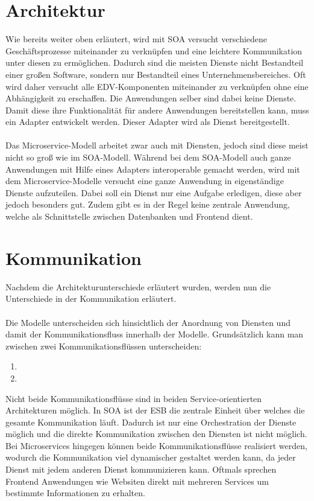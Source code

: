 \section{Architektur}
\label{sec:FazitArchitektur}
Wie bereits weiter oben erläutert, wird mit SOA versucht verschiedene Geschäftsprozesse miteinander zu verknüpfen und eine leichtere Kommunikation unter diesen zu ermöglichen. Dadurch sind die meisten Dienste nicht  Bestandteil einer großen Software, sondern nur Bestandteil eines Unternehmensbereiches. Oft wird daher versucht alle EDV-Komponenten miteinander zu verknüpfen ohne eine Abhängigkeit zu erschaffen. Die Anwendungen selber sind dabei keine Dienste. Damit diese ihre Funktionalität für andere Anwendungen bereitstellen kann, muss ein Adapter entwickelt werden. Dieser Adapter wird als Dienst bereitgestellt.
\\\\
Das Microservice-Modell arbeitet zwar auch mit Diensten, jedoch sind diese meist nicht so groß wie im SOA-Modell. Während bei dem SOA-Modell auch ganze Anwendungen mit Hilfe eines Adapters interoperable gemacht werden, wird mit dem Microservice-Modelle versucht eine ganze Anwendung in eigenständige  Dienste aufzuteilen. Dabei soll ein Dienst nur eine Aufgabe erledigen, diese aber jedoch besonders gut. Zudem gibt es in der Regel keine zentrale Anwendung, welche als Schnittstelle zwischen Datenbanken und Frontend dient.

\section{Kommunikation}
\label{sec:FazitKommunikation}
Nachdem die Architekturunterschiede erläutert wurden, werden nun die Unterschiede in der Kommunikation erläutert.
\\\\
Die Modelle unterscheiden sich hinsichtlich der Anordnung von Diensten und damit der Kommunikationsfluss innerhalb der Modelle. Grundsätzlich kann man zwischen zwei Kommunikationsflüssen unterscheiden:
\begin{enumerate}
    \item {}
    \item {}
\end{enumerate}
Nicht beide Kommunikationsflüsse sind in beiden Service-orientierten Architekturen möglich. In SOA ist der ESB die zentrale Einheit über welches die gesamte Kommunikation läuft. Dadurch ist nur eine Orchestration der Dienste möglich und die direkte Kommunikation  zwischen den Diensten ist nicht möglich. Bei Microservices hingegen können beide Kommunikationsflüsse realisiert werden, wodurch die Kommunikation viel dynamischer gestaltet werden kann, da jeder Dienst mit jedem anderen Dienst kommunizieren kann. Oftmals sprechen Frontend Anwendungen wie Websiten direkt mit mehreren Services um bestimmte Informationen zu erhalten.

